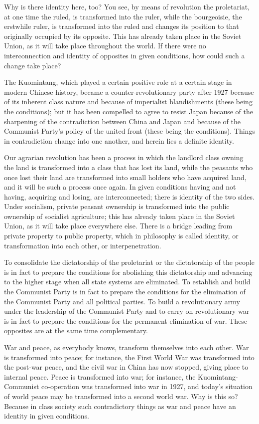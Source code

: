 \documentclass{article}
\begin{document}
Why is there identity here, too? You see, by means of revolution the
proletariat, at one time the ruled, is transformed into the ruler, while the
bourgeoisie, the erstwhile ruler, is transformed into the ruled and changes its
position to that originally occupied by its opposite. This has already taken
place in the Soviet Union, as it will take place throughout the world. If there
were no interconnection and identity of opposites in given conditions, how
could such a change take place?

The Kuomintang, which played a certain positive role at a certain stage in
modern Chinese history, became a counter-revolutionary party after 1927 because
of its inherent class nature and because of imperialist blandishments (these
being the conditions); but it has been compelled to agree to resist Japan
because of the sharpening of the contradiction between China and Japan and
because of the Communist Party's policy of the united front (these being the
conditions). Things in contradiction change into one another, and herein lies
a definite identity.

Our agrarian revolution has been a process in which the landlord class owning
the land is transformed into a class that has lost its land, while the peasants
who once lost their land are transformed into small holders who have acquired
land, and it will be such a process once again. In given conditions having and
not having, acquiring and losing, are interconnected; there is identity of the
two sides. Under socialism, private peasant ownership is transformed into the
public ownership of socialist agriculture; this has already taken place in the
Soviet Union, as it will take place everywhere else. There is a bridge leading
from private property to public property, which in philosophy is called
identity, or transformation into each other, or interpenetration.

To consolidate the dictatorship of the proletariat or the dictatorship of the
people is in fact to prepare the conditions for abolishing this dictatorship
and advancing to the higher stage when all state systems are eliminated. To
establish and build the Communist Party is in fact to prepare the conditions
for the elimination of the Communist Party and all political parties. To build
a revolutionary army under the leadership of the Communist Party and to
carry on revolutionary war is in fact to prepare the conditions for the
permanent elimination of war. These opposites are at the same time
complementary.

War and peace, as everybody knows, transform themselves into each other. War is
transformed into peace; for instance, the First World War was transformed into
the post-war peace, and the civil war in China has now stopped, giving place to
internal peace. Peace is transformed into war; for instance, the
Kuomintang-Communist co-operation was transformed into war in 1927, and today's
situation of world peace may be transformed into a second world war. Why is
this so? Because in class society such contradictory things as war and peace
have an identity in given conditions.
\end{document}
